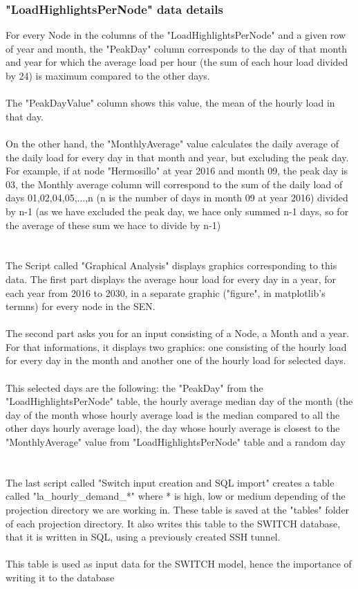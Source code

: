 \documentclass{article}
\begin{document}
\subsubsection{"LoadHighlightsPerNode" data details}
For every Node in the columns of the "LoadHighlightsPerNode" and a given row of year and month, the "PeakDay" column corresponds to the day of that month and year for which the average load per hour (the sum of each hour load divided by 24) is maximum compared to the other days. 
\\
\\The "PeakDayValue" column shows this value, the mean of the hourly load in that day. 
\\
\\On the other hand, the "MonthlyAverage" value calculates the daily average of the daily load for every day in that month and year, but excluding the peak day. For example, if at node "Hermosillo" at year 2016 and month 09, the peak day is 03, the Monthly average column will correspond to the sum of the daily load of days 01,02,04,05,...,n (n is the number of days in month 09 at year 2016) divided by n-1 (as we have excluded the peak day, we hace only summed n-1 days, so for the average of these sum we hace to divide by n-1)
\\
\\
\\
The Script called "Graphical Analysis" displays graphics corresponding to this data. The first part displays the average hour load for every day in a year, for each year from 2016 to 2030, in a separate graphic ("figure", in matplotlib's termns) for every node in the SEN.
\\
\\The second part asks you for an input consisting of a Node, a Month and a year. For that informations, it displays two graphics: one consisting of the hourly load for every day in the month and another one of the hourly load for selected days. 
\\
\\This selected days are the following: the "PeakDay" from the "LoadHighlightsPerNode" table, the hourly average median day of the month (the day of the month whose hourly average load is the median compared to all the other days hourly average load), the day whose hourly average is closest to the "MonthlyAverage" value from "LoadHighlightsPerNode" table and a random day
\\
\\
\\The last script called "Switch input creation and SQL import" creates a table called "la\_hourly\_demand\_*" where * is high, low or medium depending of the projection directory we are working in. These table is saved at the "tables" folder of each projection directory. It also writes this table to the SWITCH database, that it is written in SQL, using a previously created SSH tunnel.
\\
\\ This table is used as input data for the SWITCH model, hence the importance of writing it to the database
\end{document}
